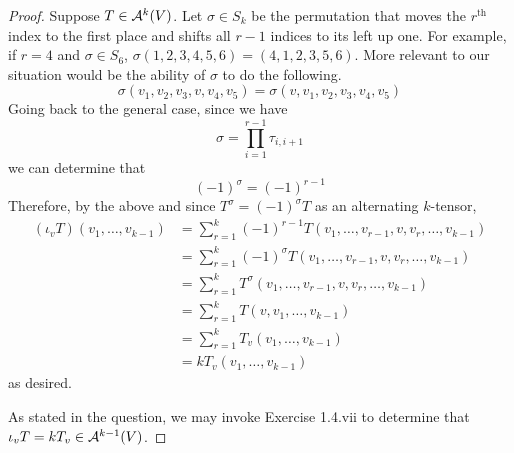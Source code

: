 \documentclass[../psets.tex]{subfiles}
\begin{document}
\begin{enumerate}[label={\textbf{1.7.\roman*.}}]
\begin{proof}
        Suppose $T\in\alt[k]{V}$. Let $\sigma\in S_k$ be the permutation that moves the $r^\text{th}$ index to the first place and shifts all $r-1$ indices to its left up one. For example, if $r=4$ and $\sigma\in S_6$, $\sigma(1,2,3,4,5,6)=(4,1,2,3,5,6)$. More relevant to our situation would be the ability of $\sigma$ to do the following.
        \begin{equation*}
            \sigma(v_1,v_2,v_3,v,v_4,v_5) = \sigma(v,v_1,v_2,v_3,v_4,v_5)
        \end{equation*}
        Going back to the general case, since we have
        \begin{equation*}
            \sigma = \prod_{i=1}^{r-1}\tau_{i,i+1}
        \end{equation*}
        we can determine that
        \begin{equation*}
            (-1)^\sigma = (-1)^{r-1}
        \end{equation*}
        Therefore, by the above and since $T^\sigma=(-1)^\sigma T$ as an alternating $k$-tensor,
        \begin{align*}
            (\iota_vT)(v_1,\dots,v_{k-1}) &= \sum_{r=1}^k(-1)^{r-1}T(v_1,\dots,v_{r-1},v,v_r,\dots,v_{k-1})\\
            &= \sum_{r=1}^k(-1)^\sigma T(v_1,\dots,v_{r-1},v,v_r,\dots,v_{k-1})\\
            &= \sum_{r=1}^kT^\sigma(v_1,\dots,v_{r-1},v,v_r,\dots,v_{k-1})\\
            &= \sum_{r=1}^kT(v,v_1,\dots,v_{k-1})\\
            &= \sum_{r=1}^kT_v(v_1,\dots,v_{k-1})\\
            &= kT_v(v_1,\dots,v_{k-1})
        \end{align*}
        as desired.\par
        As stated in the question, we may invoke Exercise 1.4.vii to determine that $\iota_vT=kT_v\in\alt[k-1]{V}$.
    \end{proof}
\end{enumerate}
\end{document}
